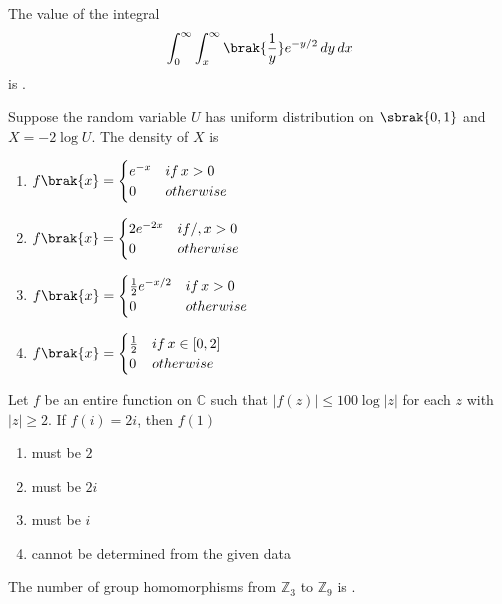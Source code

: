 \item The value of the integral
\[
\int_0^{\infty} \int_x^{\infty}  \brak{\frac{1}{y}} e^{-y/2} \, dy \, dx
\]
is \underline{\hspace{2cm}}.
\\
\item Suppose the random variable $U$ has uniform distribution on $\sbrak{0,1}$ and $ X = -2 \log U $. The density of $X$ is
\begin{enumerate}
    \item $ f\brak{x} = \begin{cases} e^{-x} & if\, x > 0 \\ 0 & otherwise \end{cases} $
    \item $ f\brak{x} = \begin{cases} 2e^{-2x} & if/, x > 0 \\ 0 & otherwise \end{cases} $
    \item $ f\brak{x} = \begin{cases} \frac{1}{2} e^{-x/2} & if\,  x > 0 \\ 0 & otherwise \end{cases} $
    \item $ f\brak{x} = \begin{cases} \frac{1}{2} & if\, x \in [0, 2] \\ 0 & otherwise \end{cases}\\ $
\end{enumerate}
\item  Let  $f$  be an entire function on $ \mathbb{C} $ such that $ |f(z)| \leq 100 \log |z| $ for each $ z $ with $ |z| \geq 2 $. If $ f(i) = 2i $, then $ f(1) $
\begin{enumerate}
    \item must be $2$ 
    \item must be $2i$
    \item must be $i$ 
    \item cannot be determined from the given data
\end{enumerate}
\item The number of group homomorphisms from $ \mathbb{Z}_{3} $ to $ \mathbb{Z}_{9} $ is \underline{\hspace{2cm}}.

